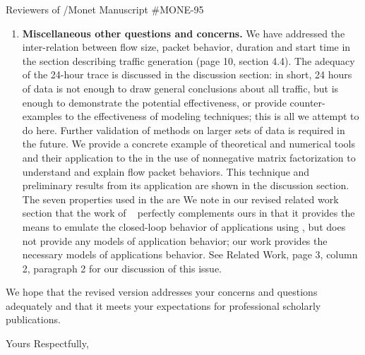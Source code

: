 \documentclass{letter}
\begin{document}
\begin{letter}{Reviewers of /Monet Manuscript \#MONE-95}
\begin{enumerate}
\item \textbf{Miscellaneous other questions and concerns.}
We have addressed the inter-relation between flow size, packet behavior, duration and start time in the section describing traffic generation (page 10, section 4.4).
The adequacy of the 24-hour trace is discussed in the discussion section: in short, 24 hours of data is not enough to draw general conclusions about all traffic, but is enough to demonstrate the potential effectiveness, or provide counter-examples to the effectiveness of modeling techniques; this is all we attempt to do here.
Further validation of methods on larger sets of data is required in the future.
We provide a concrete example of theoretical and numerical tools and their application to the  in the use of nonnegative matrix factorization to understand and explain flow packet behaviors.
This technique and preliminary results from its application are shown in the discussion section.
The seven properties used in the  are 
We note in our revised related work section that the work of \FHC~\cite{Hernandez06:dissertation} perfectly complements ours in that it provides the means to emulate the closed-loop behavior of applications using , but does not provide any models of application behavior;
our work provides the necessary models of applications behavior.
See Related Work, page 3, column 2, paragraph 2 for our discussion of this issue.

\end{enumerate}

We hope that the revised version addresses your concerns and questions adequately and that it meets your expectations for professional scholarly publications.

\closing{Yours Respectfully,}
\signature{Stefan~Karpinski}

\vfill



\end{letter}
\end{document}
